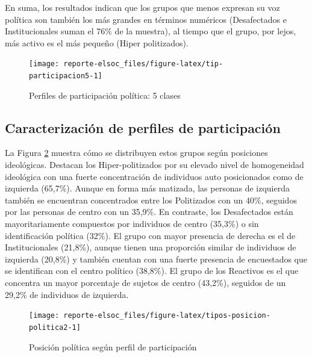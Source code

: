 \documentclass[
  12pt,
]{book}
\begin{document}
En suma, los resultados indican que los grupos que menos expresan su voz política son también los más grandes en términos numéricos (Desafectados e Institucionales suman el 76\% de la muestra), al tiempo que el grupo, por lejos, más activo es el más pequeño (Hiper politizados).

\begin{figure}

{\centering \texttt{[image: reporte-elsoc\_files/figure-latex/tip-participacion5-1]} 

}

\caption{Perfiles de participación política: 5 clases}\label{fig:tip-participacion5}
\end{figure}

\hypertarget{caracterizaciuxf3n-de-perfiles-de-participaciuxf3n}{%
\subsection*{Caracterización de perfiles de participación}\label{caracterizaciuxf3n-de-perfiles-de-participaciuxf3n}}

La Figura \ref{fig:tipos-posicion-politica2} muestra cómo se distribuyen estos grupos según posiciones ideológicas. Destacan los Hiper-politizados por su elevado nivel de homogeneidad ideológica con una fuerte concentración de individuos auto posicionados como de izquierda (65,7\%). Aunque en forma más matizada, las personas de izquierda también se encuentran concentrados entre los Politizados con un 40\%, seguidos por las personas de centro con un 35,9\%. En contraste, los Desafectados están mayoritariamente compuestos por individuos de centro (35,3\%) o sin identificación política (32\%). El grupo con mayor presencia de derecha es el de Institucionales (21,8\%), aunque tienen una proporción similar de individuos de izquierda (20,8\%) y también cuentan con una fuerte presencia de encuestados que se identifican con el centro político (38,8\%). El grupo de los Reactivos es el que concentra un mayor porcentaje de sujetos de centro (43,2\%), seguidos de un 29,2\% de individuos de izquierda.

\begin{figure}

{\centering \texttt{[image: reporte-elsoc\_files/figure-latex/tipos-posicion-politica2-1]} 

}

\caption{Posición política según perfil de participación}\label{fig:tipos-posicion-politica2}
\end{figure}
\end{document}
